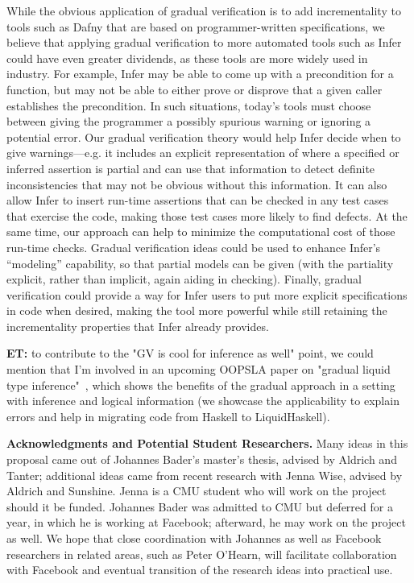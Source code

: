 \documentclass[10pt,twocolumn]{article}
\newcommand{\et}[1]{{\color{blue} {\bf ET:} #1}}
\newcommand{\minisec}[1]{\vspace{2ex}\noindent\textbf{#1}}
\begin{document}
\begin{sloppypar}
While the obvious application of gradual verification is to add incrementality to tools such as Dafny that are based on programmer-written specifications, we believe that applying gradual verification to more automated tools such as Infer could have even greater dividends, as these tools are more widely used in industry. For example, Infer may be able to come up with a precondition for a function, but may not be able to either prove or disprove that a given caller establishes the precondition.  In such situations, today's tools must choose between giving the programmer a possibly spurious warning or ignoring a potential error. Our gradual verification theory would help Infer decide when to give warnings---e.g. it includes an explicit representation of where a specified or inferred assertion is partial and can use that information to detect definite inconsistencies that may not be obvious without this information.  It can also allow Infer to insert run-time assertions that can be checked in any test cases that exercise the code, making those test cases more likely to find defects.  At the same time, our approach can help to minimize the computational cost of those run-time checks.  Gradual verification ideas could be used to enhance Infer's ``modeling'' capability, so that partial models can be given (with the partiality explicit, rather than implicit, again aiding in checking). Finally, gradual verification could provide a way for Infer users to put more explicit specifications in code when desired, making the tool more powerful while still retaining the incrementality properties that Infer already provides.

\et{to contribute to the "GV is cool for inference as well" point, we could mention that I'm involved in an upcoming OOPSLA paper on "gradual liquid type inference"~\cite{vazouAl:oopsla2018}, which shows the benefits of the gradual approach in a setting with inference and logical information (we showcase the applicability to explain errors and help in migrating code from Haskell to LiquidHaskell).}

\minisec{Acknowledgments and Potential Student Researchers.}  Many ideas in this proposal came out of Johannes Bader's master's thesis, advised by Aldrich and Tanter; additional ideas came from recent research with Jenna Wise, advised by Aldrich and Sunshine.  Jenna is a CMU student who will work on the project should it be funded.  Johannes Bader was admitted to CMU but deferred for a year, in which he is working at Facebook; afterward, he may work on the project as well.  We hope that close coordination with Johannes as well as Facebook researchers in related areas, such as Peter O'Hearn, will facilitate collaboration with Facebook and eventual transition of the research ideas into practical use.


\end{sloppypar}
\end{document}
